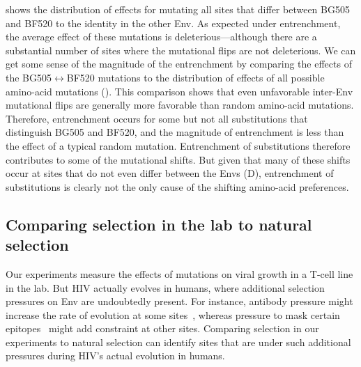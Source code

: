 \documentclass[9pt]{elife}
\begin{document}
 shows the distribution of effects for mutating all sites that differ between BG505 and BF520 to the identity in the other Env.
As expected under entrenchment, the average effect of these mutations is deleterious---although there are a substantial number of sites where the mutational flips are not deleterious. 
We can get some sense of the magnitude of the entrenchment by comparing the effects of the BG505$\leftrightarrow$BF520 mutations to the distribution of effects of all possible amino-acid mutations ().
This comparison shows that even unfavorable inter-Env mutational flips are generally more favorable than random amino-acid mutations.
Therefore, entrenchment occurs for some but not all substitutions that distinguish BG505 and BF520, and the magnitude of entrenchment is less than the effect of a typical random mutation.
Entrenchment of substitutions therefore contributes to some of the mutational shifts.
But given that many of these shifts occur at sites that do not even differ between the Envs (D), entrenchment of substitutions is clearly not the only cause of the shifting amino-acid preferences.


\subsection{Comparing selection in the lab to natural selection}
Our experiments measure the effects of mutations on viral growth in a T-cell line in the lab.
But HIV actually evolves in humans, where additional selection pressures on Env are undoubtedly present.
For instance, antibody pressure might increase the rate of evolution at some sites~\citep{albert1990rapid,wei2003antibody,richman2003rapid}, whereas pressure to mask certain epitopes~\citep{kwong2002hiv} might add constraint at other sites. 
Comparing selection in our experiments to natural selection can identify sites that are under such additional pressures during HIV's actual evolution in humans.
\end{document}
